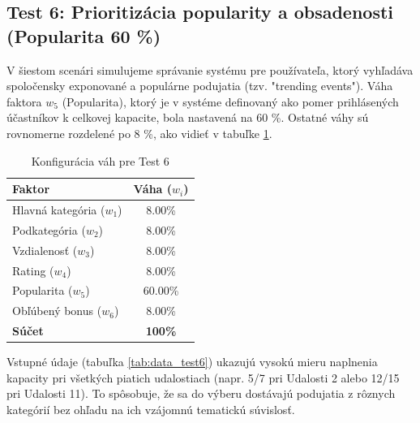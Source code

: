 \subsection{Test 6: Prioritizácia popularity a obsadenosti (Popularita 60 \%)}

V šiestom scenári simulujeme správanie systému pre používateľa, ktorý vyhľadáva spoločensky exponované a populárne podujatia (tzv. "trending events"). Váha faktora $w_5$ (Popularita), ktorý je v systéme definovaný ako pomer prihlásených účastníkov k celkovej kapacite, bola nastavená na 60 \%. Ostatné váhy sú rovnomerne rozdelené po 8 \%, ako vidieť v tabuľke \ref{tab:vahy_test6}.

\begin{table}[H]
\centering
\begin{tabular}{|l|c|}
\hline
\textbf{Faktor} & \textbf{Váha ($w_i$)} \\
\hline
Hlavná kategória ($w_1$) & 8.00\% \\
Podkategória ($w_2$) & 8.00\% \\
Vzdialenosť ($w_3$) & 8.00\% \\
Rating ($w_4$) & 8.00\% \\
Popularita ($w_5$) & 60.00\% \\
Obľúbený bonus ($w_6$) & 8.00\% \\
\hline
\textbf{Súčet} & \textbf{100\%} \\
\hline
\end{tabular}
\caption{Konfigurácia váh pre Test 6}
\label{tab:vahy_test6}
\end{table}

Vstupné údaje (tabuľka \ref{tab:data_test6}) ukazujú vysokú mieru naplnenia kapacity pri všetkých piatich udalostiach (napr. 5/7 pri Udalosti 2 alebo 12/15 pri Udalosti 11). To spôsobuje, že sa do výberu dostávajú podujatia z rôznych kategórií bez ohľadu na ich vzájomnú tematickú súvislosť.

